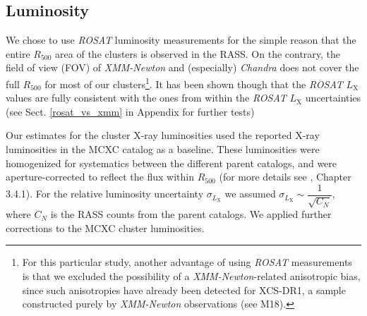 \documentclass{aa}   %
\begin{document}
\subsection{Luminosity} \label{lum_estim}

We chose to use \textit{ROSAT} luminosity measurements for the simple reason that the entire $R_{500}$ area of the clusters is observed in the RASS. On the contrary, the field of view (FOV) of \textit{XMM-Newton} and (especially) \textit{Chandra} does not cover the full $R_{500}$ for most of our clusters\footnote{For this particular study, another advantage of using \textit{ROSAT} measurements is that we excluded the possibility of a \textit{XMM-Newton}-related anisotropic bias, since such anisotropies have already been detected for XCS-DR1, a sample constructed purely by \textit{XMM-Newton} observations (see M18).}. It has been shown though that the \textit{ROSAT} $L_{\text{X}}$ values are fully consistent with the ones from  within the \textit{ROSAT} $L_{\text{X}}$ uncertainties \citep{bohrin_rosat_xmm, yuying} (see Sect. \ref{rosat_vs_xmm} in Appendix for further tests)


Our estimates for the cluster X-ray luminosities used the reported X-ray luminosities in the MCXC catalog as a baseline. These luminosities were homogenized for systematics between the different parent catalogs, and were aperture-corrected to reflect the flux within $R_{500}$ (for more details see \citet{mcxc}, Chapter 3.4.1). For the relative luminosity uncertainty $\sigma_{L_{\text{X}}}$ we assumed $\sigma_{L_{\text{X}}}\sim \dfrac{1}{\sqrt{C_N}}$, where $C_N$ is the RASS counts from the parent catalogs. We applied further corrections to the MCXC cluster luminosities.
\end{document}
